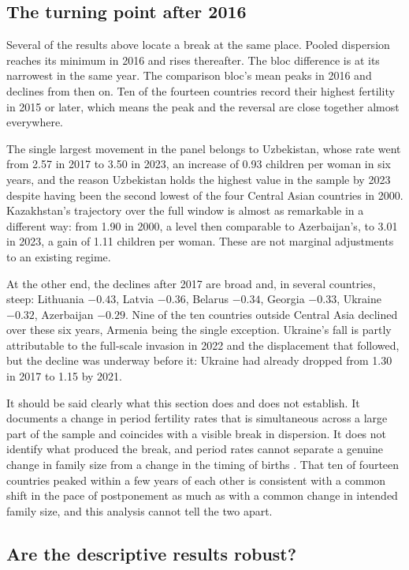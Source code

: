 \subsection{The turning point after 2016}
\label{sec:turning-point}

Several of the results above locate a break at the same place. Pooled dispersion reaches its minimum in 2016 and rises thereafter. The bloc difference is at its narrowest in the same year. The comparison bloc's mean peaks in 2016 and declines from then on. Ten of the fourteen countries record their highest fertility in 2015 or later, which means the peak and the reversal are close together almost everywhere.

The single largest movement in the panel belongs to Uzbekistan, whose rate went from 2.57 in 2017 to 3.50 in 2023, an increase of 0.93 children per woman in six years, and the reason Uzbekistan holds the highest value in the sample by 2023 despite having been the second lowest of the four Central Asian countries in 2000. Kazakhstan's trajectory over the full window is almost as remarkable in a different way: from 1.90 in 2000, a level then comparable to Azerbaijan's, to 3.01 in 2023, a gain of 1.11 children per woman. These are not marginal adjustments to an existing regime.

At the other end, the declines after 2017 are broad and, in several countries, steep: Lithuania $-0.43$, Latvia $-0.36$, Belarus $-0.34$, Georgia $-0.33$, Ukraine $-0.32$, Azerbaijan $-0.29$. Nine of the ten countries outside Central Asia declined over these six years, Armenia being the single exception. Ukraine's fall is partly attributable to the full-scale invasion in 2022 and the displacement that followed, but the decline was underway before it: Ukraine had already dropped from 1.30 in 2017 to 1.15 by 2021.

It should be said clearly what this section does and does not establish. It documents a change in period fertility rates that is simultaneous across a large part of the sample and coincides with a visible break in dispersion. It does not identify what produced the break, and period rates cannot separate a genuine change in family size from a change in the timing of births \parencite{bongaarts1998}. That ten of fourteen countries peaked within a few years of each other is consistent with a common shift in the pace of postponement as much as with a common change in intended family size, and this analysis cannot tell the two apart.

\subsection{Are the descriptive results robust?}
\label{sec:desc-robust}

